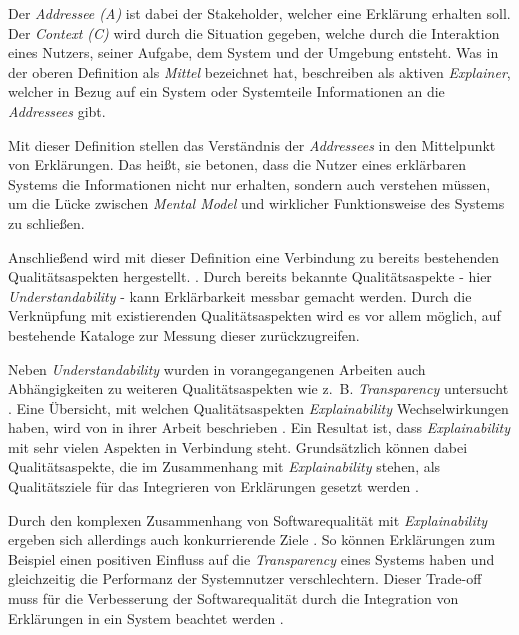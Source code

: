 \smallskip

Der \textit{Addressee (A)} ist dabei der Stakeholder, welcher eine Erklärung erhalten soll. Der \textit{Context (C)} wird durch die Situation gegeben, welche durch die Interaktion eines Nutzers, seiner Aufgabe, dem System und der Umgebung entsteht. Was \citeauthor{kohl_explainability_2019} in der oberen Definition als \textit{Mittel} bezeichnet hat, beschreiben \citeauthor{chazette_end-users_nodate} als aktiven \textit{Explainer}, welcher in Bezug auf ein 
System oder Systemteile Informationen an die \textit{Addressees} gibt.

Mit dieser Definition stellen \citeauthor{chazette_knowledge_nodate} das Verständnis der \textit{Addressees} in den Mittelpunkt von Erklärungen. Das heißt, sie betonen, dass die Nutzer eines erklärbaren Systems die Informationen nicht nur erhalten, sondern auch verstehen müssen, um die Lücke zwischen \textit{Mental Model} und wirklicher Funktionsweise des Systems zu schließen.

Anschließend wird mit dieser Definition eine Verbindung zu bereits bestehenden Qualitätsaspekten hergestellt. \cite{chazette_end-users_nodate}. Durch bereits bekannte Qualitätsaspekte - hier \textit{Understandability} - kann Erklärbarkeit messbar gemacht werden. Durch die Verknüpfung mit existierenden Qualitätsaspekten wird es vor allem möglich, auf bestehende Kataloge zur Messung dieser zurückzugreifen.

Neben \textit{Understandability} wurden in vorangegangenen Arbeiten auch Abhängigkeiten zu weiteren Qualitätsaspekten wie z.~B. \textit{Transparency} untersucht \cite{wang_integration_2020}. Eine Übersicht, mit welchen Qualitätsaspekten \textit{Explainability} Wechselwirkungen haben, wird von \citeauthor{chazette_knowledge_nodate} in ihrer Arbeit beschrieben \cite{chazette_knowledge_nodate}. Ein Resultat ist, dass \textit{Explainability} mit sehr vielen Aspekten in Verbindung steht. Grundsätzlich können dabei Qualitätsaspekte, die im Zusammenhang mit \textit{Explainability} stehen, als Qualitätsziele für das Integrieren von Erklärungen gesetzt werden \cite{wang_integration_2020}.

Durch den komplexen Zusammenhang von Softwarequalität mit \textit{Explainability} ergeben sich allerdings auch konkurrierende Ziele \cite{chazette_end-users_nodate}. So können Erklärungen zum Beispiel einen positiven Einfluss auf die \textit{Transparency} eines Systems haben und gleichzeitig die Performanz der Systemnutzer verschlechtern. Dieser Trade-off muss für die Verbesserung der Softwarequalität durch die Integration von Erklärungen in ein System beachtet werden \cite[vgl.][]{wang_integration_2020}.

